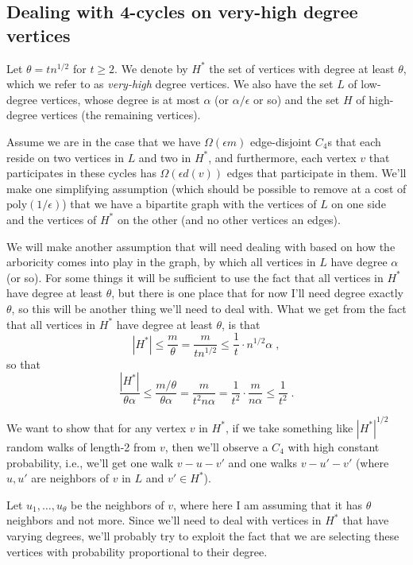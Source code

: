 \documentclass{article}
\newcommand{\eps}{\epsilon}
\newcommand{\poly}{\textrm{poly}}
\begin{document}
\subsection*{Dealing with 4-cycles on very-high degree vertices}
Let $\theta = t n^{1/2}$ for $t \geq 2$. We denote by $H^*$ the set of vertices with degree at least $\theta$, which we refer to as \emph{very-high} degree vertices. We also have the set $L$ of low-degree vertices, whose degree is at most $\alpha$ (or $\alpha/\epsilon$ or so) and the set $H$ of high-degree vertices (the remaining vertices).

Assume we are in the case that we have $\Omega(\eps m)$ edge-disjoint $C_4$s that each reside on two vertices in $L$ and two in $H^*$, and furthermore, each vertex $v$ that participates in these cycles has $\Omega(\eps d(v))$ edges that participate in them. We'll make one simplifying assumption (which should be possible to remove at a cost of $\poly(1/\epsilon)$) that we have a bipartite graph with the vertices of $L$ on one side and the vertices of $H^*$ on the other (and no other vertices an edges).

We will make another assumption that will need dealing with based on how the arboricity comes into play in the graph, by which all vertices in $L$ have degree $\alpha$ (or so). For some things it will be sufficient to use the fact that all vertices in $H^*$ have degree at least $\theta$, but there is one place that for now I'll need degree exactly $\theta$, so this will be another thing we'll need to deal with. What we get from the fact that all vertices in $H^*$ have degree at least $\theta$, is that
\begin{equation}\label{eq:Hst-lb}
|H^*| \leq \frac{m}{\theta} = \frac{m}{tn^{1/2}} \leq \frac{1}{t}\cdot n^{1/2}\alpha\;,
\end{equation}
so that
\begin{equation}\label{eq:Hst-ratio}
\frac{|H^*|}{\theta\alpha} \leq \frac{m/\theta}{\theta \alpha} = \frac{m}{t^2 n \alpha} = \frac{1}{t^2}\cdot \frac{m}{n\alpha} \leq \frac{1}{t^2}\;.
\end{equation}


We want to show that for any vertex $v$ in $H^*$, if we take something like $|H^*|^{1/2}$ random walks of length-2 from $v$, then we'll observe a $C_4$ with high constant probability, i.e., we'll get one walk $v-u-v'$ and one walks $v-u'-v'$ (where $u,u'$ are neighbors of $v$ in $L$ and $v' \in H^*$).

Let $u_1,\dots,u_\theta$ be the neighbors of $v$, where here I am assuming that it has $\theta$ neighbors and not more. Since we'll need to deal with vertices in $H^*$ that have varying degrees, we'll probably try to exploit the fact that we are selecting these vertices with probability proportional to their degree.
\end{document}
